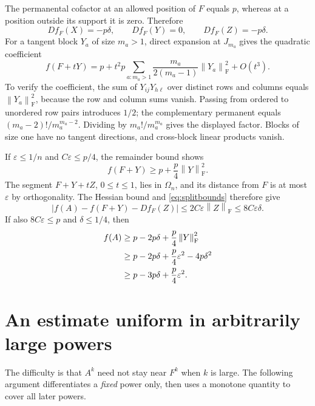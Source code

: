 \documentclass[11pt]{article}
\theoremstyle{remark}\newtheorem{remark}[theorem]{Remark}
\newcommand{\Om}{\Omega_n}
\newcommand{\fn}[1]{\left\|#1\right\|_{\mathrm F}}
\newcommand{\eps}{\varepsilon}
\begin{document}
The permanental cofactor at an allowed position of $F$ equals $p$,
whereas at a position outside its support it is zero. Therefore
\begin{equation}\label{eq:linearper}
 Df_F(X)=-p\delta,\qquad Df_F(Y)=0,\qquad Df_F(Z)=-p\delta.
\end{equation}
For a tangent block $Y_a$ of size $m_a>1$, direct expansion at $J_{m_a}$
gives the quadratic coefficient
\begin{equation}\label{eq:hessianper}
 f(F+tY)=p+t^2p\sum_{a:m_a>1}
 \frac{m_a}{2(m_a-1)}\fn{Y_a}^2+O(t^3).
\end{equation}
To verify the coefficient, the sum of $Y_{ij}Y_{h\ell}$ over distinct
rows and columns equals $\fn{Y_a}^2$, because the row and column sums
vanish. Passing from ordered to unordered row pairs introduces $1/2$;
the complementary permanent equals $(m_a-2)!/m_a^{m_a-2}$.
Dividing by $m_a!/m_a^{m_a}$ gives the displayed factor. Blocks of size
one have no tangent directions, and cross-block linear products vanish.

If $\eps\le1/n$ and $C\eps\le p/4$, the remainder bound shows
\begin{equation}\label{eq:tangentlower}
 f(F+Y)\ge p+\frac p4\fn Y^2.
\end{equation}
The segment $F+Y+tZ$, $0\le t\le1$, lies in $\Om$, and its distance
from $F$ is at most $\eps$ by orthogonality. The Hessian bound and
\eqref{eq:splitbounds} therefore give
\[
 |f(A)-f(F+Y)-Df_F(Z)|\le2C\eps\fn Z\le8C\eps\delta.
\]
If also $8C\eps\le p$ and $\delta\le1/4$, then
\begin{align}
 f(A)&\ge p-2p\delta+\frac p4\fn Y^2\notag\\
 &\ge p-2p\delta+\frac p4\eps^2-4p\delta^2\notag\\
 &\ge p-3p\delta+\frac p4\eps^2.\label{eq:startinglower}
\end{align}

\section{An estimate uniform in arbitrarily large powers}
The difficulty is that $A^k$ need not stay near $F^k$ when $k$ is large.
The following argument differentiates a \emph{fixed} power only, then
uses a monotone quantity to cover all later powers.
\end{document}
